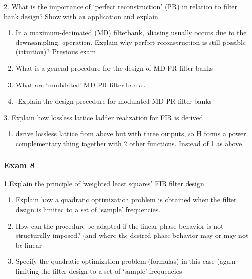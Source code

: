 \documentclass[
  a4paper,
  ,captions=tableheading
]{scrartcl}
\providecommand{\tightlist}{%
  \setlength{\itemsep}{0pt}\setlength{\parskip}{0pt}}
\begin{document}
2. What is the importance of `perfect reconstruction' (PR) in relation
to filter bank design? Show with an application and explain

\begin{enumerate}
\def\labelenumi{\arabic{enumi}.}
\tightlist
\item
  In a maximum-decimated (MD) filterbank, aliasing usually occurs due to
  the downsampling. operation. Explain why perfect reconstruction is
  still possible (intuition)? Previous exam\\
\item
  What is a general procedure for the design of MD-PR filter banks\\
\item
  What are `modulated' MD-PR filter banks.\\
\item
  -Explain the design procedure for modulated MD-PR filter banks
\end{enumerate}

3. Explain how lossless lattice ladder realization for FIR is derived.

\begin{enumerate}
\def\labelenumi{\arabic{enumi}.}
\tightlist
\item
  derive lossless lattice from above but with three outputs, so H forms
  a power complementary thing together with 2 other functions. Instead
  of 1 as above.
\end{enumerate}

\subsubsection{}\label{section-29}

\subsubsection{}\label{section-30}

\subsubsection{Exam 8}\label{exam-8}

1.Explain the principle of `weighted least squares' FIR filter design

\begin{enumerate}
\def\labelenumi{\arabic{enumi}.}
\tightlist
\item
  Explain how a quadratic optimization problem is obtained when the
  filter design is limited to a set of `sample' frequencies.\\
\item
  How can the procedure be adapted if the linear phase behavior is not
  structurally imposed? (and where the desired phase behavior may or may
  not be linear\\
\item
  Specify the quadratic optimization problem (formulas) in this case
  (again limiting the filter design to a set of `sample' frequencies
\end{enumerate}
\end{document}
